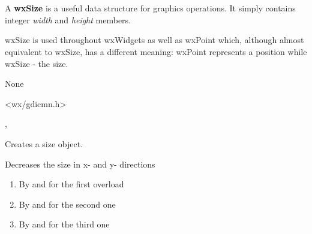 
\section{}\label{wxsize}

A {\bf wxSize} is a useful data structure for graphics operations.
It simply contains integer {\it width} and {\it height} members.

wxSize is used throughout wxWidgets as well as wxPoint which, although almost
equivalent to wxSize, has a different meaning: wxPoint represents a position
while wxSize - the size.



None


<wx/gdicmn.h>


, 



\label{wxsizector}



Creates a size object.



\label{wxsizedecby}




Decreases the size in x- and y- directions

\begin{enumerate}
    \item By  and  for the first overload
    \item By  and  for the second one
    \item By  and  for the third one
\end{enumerate}

